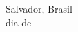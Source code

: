\begin{agradecimentos}







\ \\
\ \\

\noindent

\raggedright
Salvador, Brasil \\ 
dia de \mesdeano \\

\raggedleft
\theauthor\\ \theauthorr\\ %

\end{agradecimentos}
